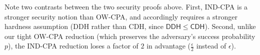 Note two contrasts between the two security proofs above. First, IND-CPA is a stronger security notion than OW-CPA, and accordingly requires a stronger hardness assumption (DDH rather than CDH, since \(\mathsf{DDH} \le \mathsf{CDH}\)). Second, unlike our tight OW-CPA reduction (which preserves the adversary's success probability \(p\)), the IND-CPA reduction loses a factor of \(2\) in advantage (\(\frac{\epsilon}{2}\) instead of \(\epsilon\)).
